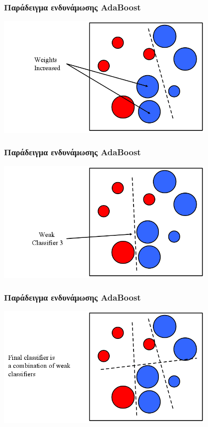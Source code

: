 \documentclass{beamer}
\begin{document}
\begin{frame}
\frametitle{Παράδειγμα ενδυνάμωσης AdaBoost}
\begin{center}
\includegraphics[width=0.8\textwidth]{images/boosting/boosting-4}
\end{center}
\end{frame}

\begin{frame}
\frametitle{Παράδειγμα ενδυνάμωσης AdaBoost}
\begin{center}
\includegraphics[width=0.8\textwidth]{images/boosting/boosting-5}
\end{center}
\end{frame}

\begin{frame}
\frametitle{Παράδειγμα ενδυνάμωσης AdaBoost}
\begin{center}
\includegraphics[width=0.8\textwidth]{images/boosting/boosting-6}
\end{center}
\end{frame}
\end{document}
